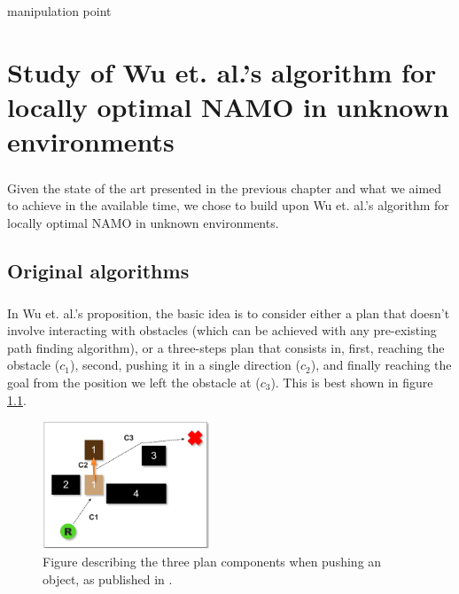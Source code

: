 manipulation point%

\chapter{Study of Wu et. al.'s algorithm for locally optimal NAMO in unknown environments} %

\label{Chapter3} %

\paragraph{} Given the state of the art presented in the previous chapter and what we aimed to achieve in the available time, we chose to build upon Wu et. al.'s algorithm for locally optimal NAMO in unknown environments.

\section{Original algorithms}

\paragraph{} In Wu et. al.'s proposition, the basic idea is to consider either a plan that doesn't involve interacting with obstacles (which can be achieved with any pre-existing path finding algorithm), or a three-steps plan that consists in, first, reaching the obstacle ($c_{1}$), second, pushing it in a single direction ($c_{2}$), and finally reaching the goal from the position we left the obstacle at ($c_{3}$). This is best shown in figure \ref{fig:Wu_Original_Algorithm-wu_components_illus}.

\begin{figure}[H]
\centering
\includegraphics[width=5cm]{Figures/Wu_Original_Algorithm/wu_components_illus.png}
\caption{Figure describing the three plan components when pushing an object, as published in \parencite{wu_navigation_2010}.}
\label{fig:Wu_Original_Algorithm-wu_components_illus}
\end{figure}

